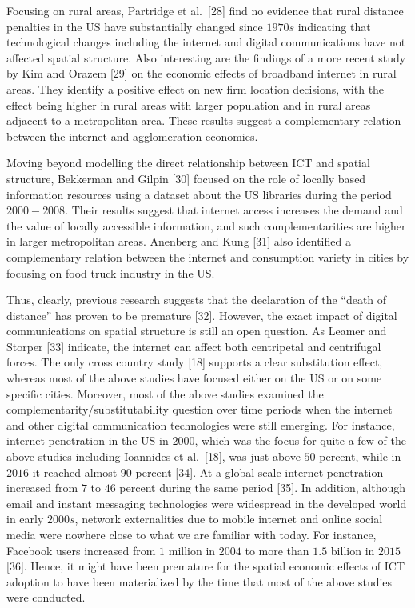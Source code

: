 \documentclass[10pt,letterpaper]{article}
\begin{document}
Focusing on rural areas, Partridge et al.~{[}28{]} find no evidence that
rural distance penalties in the US have substantially changed since
\(1970s\) indicating that technological changes including the internet
and digital communications have not affected spatial structure. Also
interesting are the findings of a more recent study by Kim and Orazem
{[}29{]} on the economic effects of broadband internet in rural areas.
They identify a positive effect on new firm location decisions, with the
effect being higher in rural areas with larger population and in rural
areas adjacent to a metropolitan area. These results suggest a
complementary relation between the internet and agglomeration economies.

Moving beyond modelling the direct relationship between ICT and spatial
structure, Bekkerman and Gilpin {[}30{]} focused on the role of locally
based information resources using a dataset about the US libraries
during the period \(2000-2008\). Their results suggest that internet
access increases the demand and the value of locally accessible
information, and such complementarities are higher in larger
metropolitan areas. Anenberg and Kung {[}31{]} also identified a
complementary relation between the internet and consumption variety in
cities by focusing on food truck industry in the US.

Thus, clearly, previous research suggests that the declaration of the
``death of distance'' has proven to be premature {[}32{]}. However, the
exact impact of digital communications on spatial structure is still an
open question. As Leamer and Storper {[}33{]} indicate, the internet can
affect both centripetal and centrifugal forces. The only cross country
study {[}18{]} supports a clear substitution effect, whereas most of the
above studies have focused either on the US or on some specific cities.
Moreover, most of the above studies examined the
complementarity/substitutability question over time periods when the
internet and other digital communication technologies were still
emerging. For instance, internet penetration in the US in \(2000\),
which was the focus for quite a few of the above studies including
Ioannides et al.~{[}18{]}, was just above \(50\) percent, while in
\(2016\) it reached almost \(90\) percent {[}34{]}. At a global scale
internet penetration increased from \(7\) to \(46\) percent during the
same period {[}35{]}. In addition, although email and instant messaging
technologies were widespread in the developed world in early \(2000s\),
network externalities due to mobile internet and online social media
were nowhere close to what we are familiar with today. For instance,
Facebook users increased from \(1\) million in \(2004\) to more than
\(1.5\) billion in \(2015\) {[}36{]}. Hence, it might have been
premature for the spatial economic effects of ICT adoption to have been
materialized by the time that most of the above studies were conducted.
\end{document}
